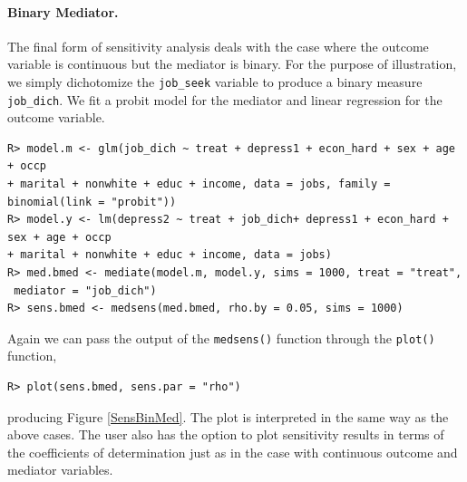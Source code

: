 \documentclass[11pt,letterpaper]{article}
\theoremstyle{plain}
\begin{document}
\paragraph{Binary Mediator.}
The final form of sensitivity analysis deals with the case where the
outcome variable is continuous but the mediator is binary.  For the
purpose of illustration, we simply dichotomize the \texttt{job\_seek}
variable to produce a binary measure \texttt{job\_dich}. We fit a
probit model for the mediator and linear regression for the outcome
variable.
\begin{verbatim}
R> model.m <- glm(job_dich ~ treat + depress1 + econ_hard + sex + age + occp
+ marital + nonwhite + educ + income, data = jobs, family = binomial(link = "probit"))
R> model.y <- lm(depress2 ~ treat + job_dich+ depress1 + econ_hard + sex + age + occp
+ marital + nonwhite + educ + income, data = jobs)
R> med.bmed <- mediate(model.m, model.y, sims = 1000, treat = "treat",
 mediator = "job_dich")
R> sens.bmed <- medsens(med.bmed, rho.by = 0.05, sims = 1000)
\end{verbatim}
Again we can pass the output of the \texttt{medsens()} function through the \texttt{plot()} function,
\begin{verbatim}
R> plot(sens.bmed, sens.par = "rho")
\end{verbatim}
producing Figure \ref{SensBinMed}. The plot is interpreted in the same
way as the above cases. The user also has the option to plot sensitivity results
in terms of the coefficients of determination just as in the case with
continuous outcome and mediator variables.
\end{document}
